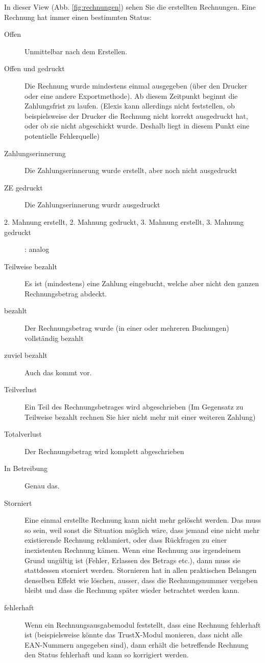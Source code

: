In dieser View (Abb. \ref{fig:rechnungen}) sehen Sie die erstellten Rechnungen. Eine Rechnung hat immer einen bestimmten Status:
\begin{description}
    \item [Offen] Unmittelbar nach dem Erstellen.
    \item [Offen und gedruckt] Die Rechnung wurde mindestens einmal ausgegeben (über den Drucker oder eine andere Exportmethode). Ab diesem Zeitpunkt beginnt die Zahlungsfrist zu laufen. (Elexis kann allerdings nicht feststellen, ob beispielsweise der Drucker die Rechnung nicht korrekt ausgedruckt hat, oder ob sie nicht abgeschickt wurde. Deshalb liegt in diesem Punkt eine potentielle Fehlerquelle)
    \item[Zahlungserinnerung] Die Zahlungserinnerung wurde erstellt, aber noch nicht ausgedruckt
    \item[ZE gedruckt] Die Zahlungserinnerung wurdr ausgedruckt
    \item [2. Mahnung erstellt, 2. Mahnung gedruckt, 3. Mahnung erstellt, 3. Mahnung gedruckt]: analog
    \item[Teilweise bezahlt] Es ist (mindestens) eine Zahlung eingebucht, welche aber nicht den ganzen Rechnungsbetrag abdeckt.
    \item[bezahlt] Der Rechnungsbetrag wurde (in einer oder mehreren Buchungen) vollständig bezahlt
    \item [zuviel bezahlt] Auch das kommt vor.
    \item [Teilverlust] Ein Teil des Rechnungsbetrages wird abgeschrieben (Im Gegensatz zu \glqq Teilweise bezahlt\grqq{} rechnen Sie hier nicht mehr mit einer weiteren Zahlung)
    \item [Totalverlust] Der Rechnungsbetrag wird komplett abgeschrieben
    \item [In Betreibung] Genau das.
    \item [Storniert] Eine einmal erstellte Rechnung kann nicht mehr gelöscht werden. Das muss so sein, weil sonst die Situation möglich wäre, dass jemand eine nicht mehr existierende Rechnung reklamiert, oder dass Rückfragen zu einer inexistenten Rechnung kämen. Wenn eine Rechnung aus irgendeinem Grund ungültig ist (Fehler, Erlassen des Betrags etc.), dann muss sie stattdessen storniert werden. Stornieren hat in allen praktischen Belangen denselben Effekt wie löschen, ausser, dass die Rechnungsnummer vergeben bleibt und dass die Rechnung später wieder betrachtet werden kann.
    \item [fehlerhaft] Wenn ein Rechnungsausgabemodul feststellt, dass eine Rechnung fehlerhaft ist (beispielsweise könnte das TrustX-Modul monieren, dass nicht alle EAN-Nummern angegeben sind), dann erhält die betreffende Rechnung den Status fehlerhaft und kann so korrigiert werden.

\end{description}
